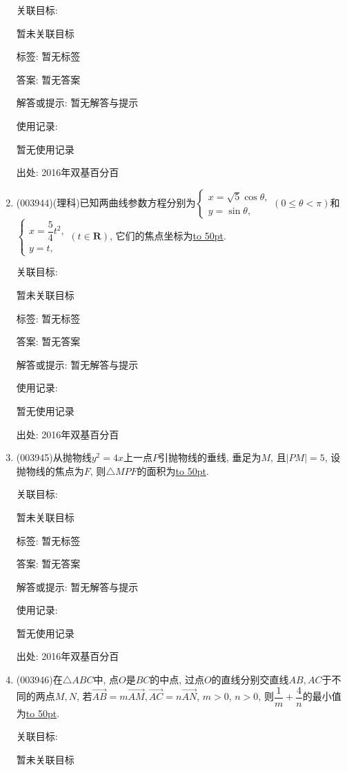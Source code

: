 \documentclass[10pt,a4paper]{article}
\newcommand{\blank}[1]{\underline{\hbox to #1pt{}}}
\begin{document}
\begin{enumerate}[1.]
关联目标:

暂未关联目标



标签: 暂无标签

答案: 暂无答案

解答或提示: 暂无解答与提示

使用记录:

暂无使用记录


出处: 2016年双基百分百
\item { (003944)}(理科)已知两曲线参数方程分别为$\begin{cases}x=\sqrt{5}\cos\theta,\\y=\sin\theta,\end{cases} (0\le \theta<\pi)$和$\begin{cases}
x=\dfrac 54 t^2, \\ y=t, \end{cases}
(t\in \mathbf{R})$, 它们的焦点坐标为\blank{50}.


关联目标:

暂未关联目标



标签: 暂无标签

答案: 暂无答案

解答或提示: 暂无解答与提示

使用记录:

暂无使用记录


出处: 2016年双基百分百
\item { (003945)}从抛物线$y^2=4x$上一点$P$引抛物线的垂线, 垂足为$M$, 且$|PM|=5$, 设抛物线的焦点为$F$, 则$\triangle MPF$的面积为\blank{50}.


关联目标:

暂未关联目标



标签: 暂无标签

答案: 暂无答案

解答或提示: 暂无解答与提示

使用记录:

暂无使用记录


出处: 2016年双基百分百
\item { (003946)}在$\triangle ABC$中, 点$O$是$BC$的中点, 过点$O$的直线分别交直线$AB,AC$于不同的两点$M,N$, 若$\overrightarrow{AB}=m\overrightarrow{AM}, \overrightarrow{AC}=n\overrightarrow{AN}$, $m>0$, $n>0$, 则$\dfrac 1m+\dfrac 4n$的最小值为\blank{50}.


关联目标:

暂未关联目标




\end{enumerate}
\end{document}

